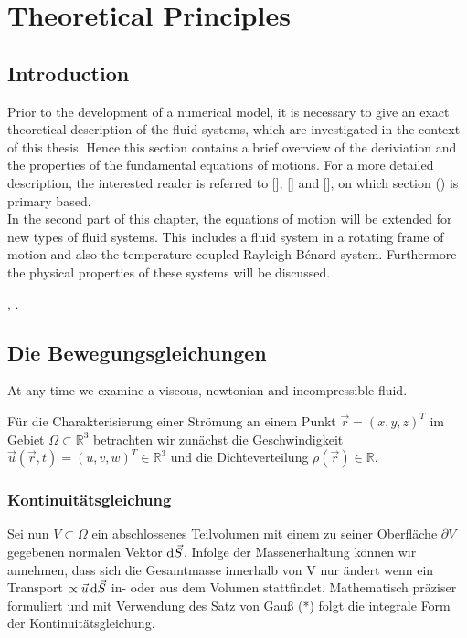 \chapter{Theoretical Principles}

\section{Introduction}

Prior to the development of a numerical model, it is necessary to give an exact theoretical description of the
fluid systems, which are investigated in the context of this thesis.
Hence this section contains a brief overview of the deriviation and the properties of the fundamental equations of motions.
For a more detailed description, the interested reader is referred to [], [] and [], on which section () is primary based.\\
In the second part of this chapter, the equations of motion will be extended for new types of fluid systems.
This includes a fluid system in a rotating frame of motion and also the temperature coupled Rayleigh-B\'{e}nard system.
Furthermore the physical properties of these systems will be discussed.

\citep{Fadlun2000}, \citet{Fadlun2000}.

\section{Die Bewegungsgleichungen}
At any time we examine a viscous, newtonian and incompressible fluid.

Für die Charakterisierung einer Strömung an einem Punkt $\vec{r} = (x, y, z)^T$  im Gebiet $\Omega \subset \mathbb{R}^3$ betrachten wir zunächst
die Geschwindigkeit $\vec{u}(\vec{r}, t) = (u, v, w)^T \in \mathbb{R}^3$ und die Dichteverteilung $\rho(\vec{r}) \in \mathbb{R}$.

\subsection{Kontinuitätsgleichung}

Sei nun $V \subset \Omega$  ein abschlossenes Teilvolumen mit einem zu seiner Oberfläche $\partial V$ gegebenen normalen Vektor $\mathop{}\!\mathrm{d} \vec{S}$.
Infolge der Massenerhaltung können wir annehmen, dass sich die Gesamtmasse innerhalb von V nur ändert wenn ein
Transport $\propto \vec{u}\mathop{}\!\mathrm{d} \vec{S}$ in- oder aus dem Volumen stattfindet.
Mathematisch präziser formuliert und mit Verwendung des Satz von Gauß (*) folgt die integrale Form der Kontinuitätsgleichung.

